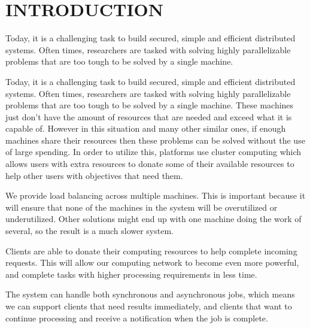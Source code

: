 \section{INTRODUCTION}\label{sec:introduction}


Today, it is a challenging task to build secured, simple and efficient distributed
systems. Often times, researchers are tasked with solving highly parallelizable problems
that are too tough to be solved by a single machine. 

Today, it is a challenging task to build secured, simple and efficient distributed systems. Often times, researchers are tasked with solving highly parallelizable problems that are too tough to be solved by a single machine. These machines just don’t have the amount of resources that are needed and exceed what it is capable of. However in this situation and many other similar ones, if enough machines share their resources then these problems can be solved without the use of large spending. In order to utilize this, platforms use cluster computing which allows users with extra resources to donate some of their available resources to help other users with objectives that need them.

We provide load balancing across multiple machines. This is important because it will ensure that none of the machines in the system will be overutilized or underutilized. Other solutions might end up with one machine doing the work of several, so the result is a much slower system.

Clients are able to donate their computing resources to help complete incoming requests. This will allow our computing network to become even more powerful, and complete tasks with higher processing requirements in less time.

The system can handle both synchronous and asynchronous jobs, which means we can support clients that need results immediately, and clients that want to continue processing and receive a notification when the job is complete.